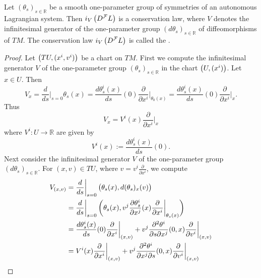 \begin{theorem}
	\label{thm:Noethers_theorem_Lagrangian_version}	
	Let $(\theta_s)_{s \in \mathbb{R}}$ be a smooth one-parameter group of symmetries of an autonomous Lagrangian system. Then $i_V\del[1]{D^\mathcal{F}L}$ is a conservation law, where $V$ denotes the infinitesimal generator of the one-parameter group $(d\theta_s)_{s \in \mathbb{R}}$ of diffeomorphisms of $TM$. The conservation law $i_V\del[1]{D^\mathcal{F}L}$ is called the .
\end{theorem}

\begin{proof}
	Let $\del[1]{TU,(x^i,v^i)}$ be a chart on $TM$. First we compute the infinitesimal generator $V$ of the one-parameter group $(\theta_s)_{s \in \mathbb{R}}$ in the chart $\del[1]{U,(x^i)}$. Let $x \in U$. Then
	\begin{equation*}
		V_x = \frac{d}{ds}\bigg\vert_{s = 0}\theta_s(x) = \frac{d\theta_s^i(x)}{ds}(0) \frac{\partial}{\partial x^i}\bigg\vert_{\theta_0(x)} = \frac{d\theta_s^i(x)}{ds}(0) \frac{\partial}{\partial x^i}\bigg\vert_x.
	\end{equation*}
	Thus 
	\begin{equation*}
		V_x = V^i(x) \frac{\partial}{\partial x^i}\bigg\vert_x 
	\end{equation*}
	\noindent where $V^i : U \to \mathbb{R}$ are given by
	\begin{equation*}
		V^i(x) := \frac{d \theta_s^i(x)}{ds}(0).
	\end{equation*}
	Next consider the infinitesimal generator $V$ of the one-parameter group $(d\theta_s)_{s \in \mathbb{R}}$. For $(x,v) \in TU$, where $v = v^i \frac{\partial}{\partial x^i}$, we compute
	\begin{align*}
		V_{(x,v)} &= \frac{d}{ds}\bigg\vert_{s = 0} \del[1]{\theta_s(x),d(\theta_s)_x(v)}\\
		&= \frac{d}{ds}\bigg\vert_{s = 0} \del[3]{\theta_s(x),v^j\frac{\partial \theta_s^i}{\partial x^j}(x)\frac{\partial}{\partial x^i}\bigg\vert_{\theta_s(x)}}\\
		&= \frac{d \theta_s^i(x)}{ds}(0)\frac{\partial}{\partial x^i}\bigg\vert_{(x,v)} + v^j\frac{\partial^2 \theta^i}{\partial s\partial x^j}(0,x) \frac{\partial}{\partial v^i}\bigg\vert_{(x,v)}\\
		&= V^i(x)\frac{\partial}{\partial x^i}\bigg\vert_{(x,v)} + v^j\frac{\partial^2 \theta^i}{\partial x^j\partial s}(0,x) \frac{\partial}{\partial v^i}\bigg\vert_{(x,v)}\\

\end{align*}
\end{proof}
